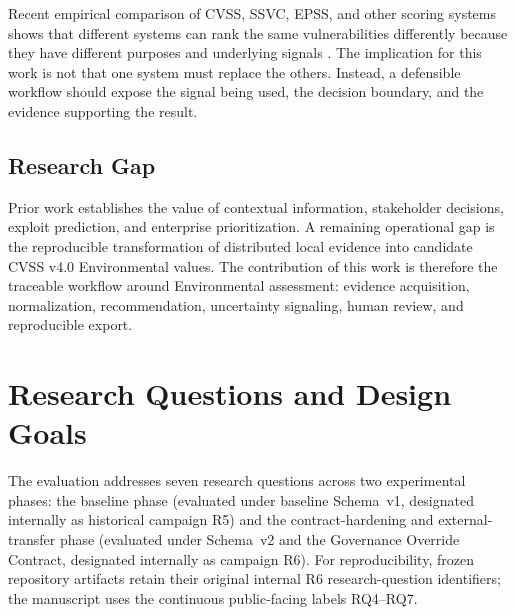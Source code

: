 \documentclass[conference]{IEEEtran}
\begin{document}
Recent empirical comparison of CVSS, SSVC, EPSS, and other scoring systems
shows that different systems can rank the same vulnerabilities differently
because they have different purposes and underlying signals
\cite{koscinski2025}. The implication for this work is not that one system must
replace the others. Instead, a defensible workflow should expose the signal
being used, the decision boundary, and the evidence supporting the result.

\subsection{Research Gap}

Prior work establishes the value of contextual information, stakeholder
decisions, exploit prediction, and enterprise prioritization. A remaining
operational gap is the reproducible transformation of distributed local
evidence into candidate CVSS v4.0 Environmental values. The contribution of
this work is therefore the traceable workflow around Environmental assessment:
evidence acquisition, normalization, recommendation, uncertainty signaling,
human review, and reproducible export.

\section{Research Questions and Design Goals}

The evaluation addresses seven research questions across two experimental phases: the baseline phase (evaluated under baseline Schema~v1, designated internally as historical campaign R5) and the contract-hardening and external-transfer phase (evaluated under Schema~v2 and the Governance Override Contract, designated internally as campaign R6). For reproducibility, frozen repository artifacts retain their original internal R6 research-question identifiers; the manuscript uses the continuous public-facing labels RQ4--RQ7.
\end{document}
